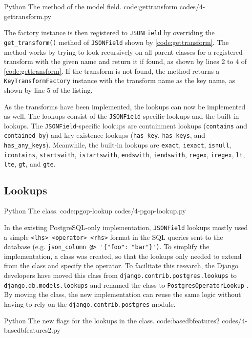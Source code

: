 \listing
{Python}
{The  method of the  model field.}
{code:gettransform}
{codes/4-gettransform.py}

The factory instance is then registered to \verb|JSONField| by overriding the
\verb|get_transform()| method of \verb|JSONField| shown by
\autoref{code:gettransform}. The method works by trying to look recursively on
all parent classes for a registered transform with the given name and return it
if found, as shown by lines 2 to 4 of \autoref{code:gettransform}. If the
transform is not found, the method returns a \verb|KeyTransformFactory|
instance with the transform name as the key name, as shown by line 5 of the
listing.

As the transforms have been implemented, the lookups can now be implemented as
well. The lookups consist of the \verb|JSONField|-specific lookups and the
built-in lookups. The \verb|JSONField|-specific lookups are containment lookups
(\verb|contains| and \verb|contained_by|) and key existence lookups
(\verb|has_key|, \verb|has_keys|, and \verb|has_any_keys|). Meanwhile, the
built-in lookups are \verb|exact|, \verb|iexact|, \verb|isnull|,
\verb|icontains|, \verb|startswith|, \verb|istartswith|, \verb|endswith|,
\verb|iendswith|, \verb|regex|, \verb|iregex|, \verb|lt|, \verb|lte|,
\verb|gt|, and \verb|gte|.

\subsection{ Lookups}

\listing
{Python}
{The  class.}
{code:pgop-lookup}
{codes/4-pgop-lookup.py}

In the existing PostgreSQL-only implementation, \verb|JSONField| lookups mostly
used a simple \verb|<lhs> <operator> <rhs>| format in the SQL queries sent to
the database (e.g. \verb|json_column @> '{"foo": "bar"}')|. To simplify the
implementation, a  class was created, so that the
lookups only needed to extend from the class and specify the operator. To
facilitate this research, the Django developers have moved this class from
\verb|django.contrib.postgres.lookups| to \verb|django.db.models.lookups| and
renamed the class to \verb|PostgresOperatorLookup|
\cite{gh-django:pgop-lookup}. By moving the class, the new implementation can
reuse the same logic without having to rely on the
\verb|django.contrib.postgres| module.

\listing
{Python}
{The new flags for the  lookups in the  class.}
{code:basedbfeatures2}
{codes/4-basedbfeatures2.py}

